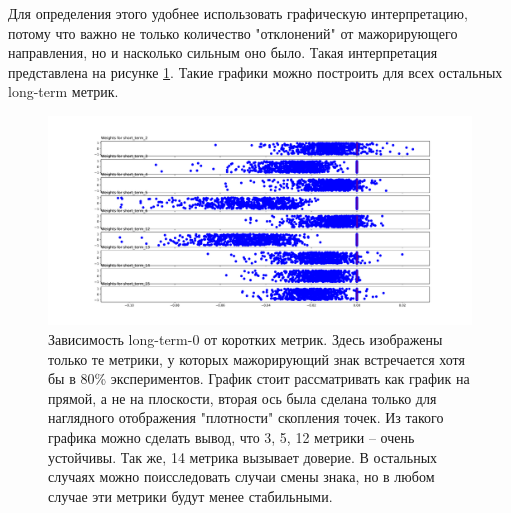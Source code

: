 \documentclass{article}
\begin{document}
	Для определения этого удобнее использовать графическую интерпретацию, потому что важно не только количество "отклонений" от мажорирующего направления, но и насколько сильным оно было. Такая интерпретация представлена на рисунке \ref{fig:0_metric_stability}. Такие графики можно построить для всех остальных long-term метрик.
	
	\begin{figure}
		\includegraphics[scale=0.4]{0_metric_stability.pdf}
		\caption{Зависимость long-term-0 от коротких метрик. Здесь изображены только те метрики, у которых мажорирующий знак встречается хотя бы в 80\% экспериментов. График стоит рассматривать как график на прямой, а не на плоскости, вторая ось была сделана только для наглядного отображения "плотности" скопления точек. Из такого графика можно сделать вывод, что 3, 5, 12 метрики -- очень устойчивы. Так же, 14 метрика вызывает доверие. В остальных случаях можно поисследовать случаи смены знака, но в любом случае эти метрики будут менее стабильными.}
		\label{fig:0_metric_stability}
	\end{figure}


	
\end{document}
